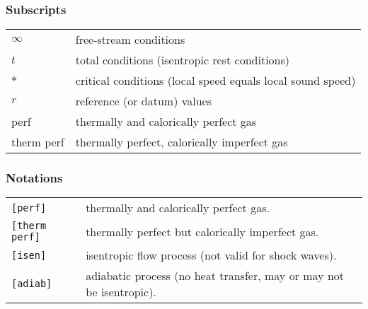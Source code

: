 \newpage

\subsubsection{Subscripts}

\begin{flushleft}
\renewcommand{\arraystretch}{1.3}
\begin{tabular}{ll}
$\infty$ & free-stream conditions \\
$t$ & total conditions (isentropic rest conditions) \\
$*$ & critical conditions (local speed equals local sound speed) \\
$r$ & reference (or datum) values \\
perf & thermally and calorically perfect gas \\
therm perf & thermally perfect, calorically imperfect gas \\
\end{tabular}
\end{flushleft}

\subsubsection{Notations}

\begin{flushleft}
\renewcommand{\arraystretch}{1.3}
\begin{tabular}{ll}
    \texttt{[perf]} & thermally and calorically perfect gas. \\
    \texttt{[therm perf]} & thermally perfect but calorically imperfect gas.\\
    \texttt{[isen]} & isentropic flow process (not valid for shock waves).\\
    \texttt{[adiab]} & adiabatic process (no heat transfer, may or may not be isentropic).\\
\end{tabular}
\end{flushleft}
